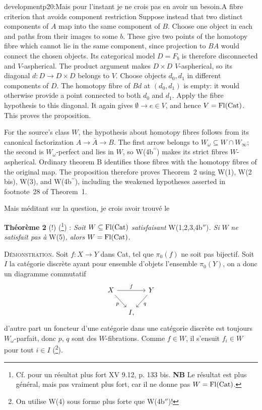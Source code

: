 \begin{dcomment}{development}{p20:Mais pour l'instant je ne crois pas en avoir un besoin.}{A fibre criterion that avoids component restriction}
Suppose instead that two distinct components of \(A\) map into the same component of \(B\). Choose one object in each and paths from their images to some \(b\). These give two points of the homotopy fibre which cannot lie in the same component, since projection to \(BA\) would connect the chosen objects. Its categorical model \(D=F_b\) is therefore disconnected and \(V\)-aspherical. The product argument makes \(D\times D\) \(V\)-aspherical, so its diagonal \(d:D\to D\times D\) belongs to \(V\). Choose objects \(d_0,d_1\) in different components of \(D\). The homotopy fibre of \(Bd\) at \((d_0,d_1)\) is empty: it would otherwise provide a point connected to both \(d_0\) and \(d_1\). Apply the fibre hypothesis to this diagonal. It again gives \(\emptyset\to e\in V\), and hence \(V=\mathrm{Fl}(\mathrm{Cat})\). This proves the proposition.

For the source's class \(W\), the hypothesis about homotopy fibres follows from its canonical factorization \(A\to\bar A\to B\). The first arrow belongs to \(W_\omega\subseteq W\cap W_\infty\); the second is \(W_\omega\)-perfect and lies in \(W\), so W(4b\(^{\prime\prime}\)) makes its strict fibres \(W\)-aspherical. Ordinary theorem B identifies those fibres with the homotopy fibres of the original map. The proposition therefore proves Theorem~2 using W(1), W(2 bis), W(3), and W(4b\(^{\prime\prime}\)), including the weakened hypotheses asserted in footnote~28 of Theorem~1.
\end{dcomment}


Mais méditant sur la question, je crois avoir trouvé le

\textbf{Théorème 2} (!) (\footnote[41]{Cf. pour un résultat plus fort XV 9.12, p. 133 bis. \textbf{NB} Le résultat est plus général, mais pas vraiment plus fort, car il ne donne pas $W = \mathrm{Fl}(\mathrm{Cat})$.}) : \textit{Soit} $W \subseteq \mathrm{Fl}(\mathrm{Cat})$ \textit{satisfaisant} W(1,2,3,4b$''$)\textit{. Si} $W$ \textit{ne satisfait pas à} W(5)\textit{, alors} $W = \mathrm{Fl}(\mathrm{Cat})$.

\textsc{Démonstration}. Soit $f : X \longrightarrow Y$ dans Cat, tel que $\pi_0(f)$ ne soit pas bijectif. Soit $I$ la catégorie discrète ayant pour ensemble d'objets l'ensemble $\pi_0(Y)$, on a donc un diagramme commutatif
\[
\begin{tikzcd}[column sep=small]
X \arrow[rr, "f"] \arrow[dr, "p"'] & & Y \arrow[dl, "q"] \\
& I, &
\end{tikzcd}
\]
d'autre part un foncteur d'une catégorie dans une catégorie discrète est toujours $W_\omega$-parfait, donc $p$, $q$ sont des $W$-fibrations. Comme $f \in W$, il s'ensuit $f_i \in W$ pour tout $i \in I$ (\footnote[42]{On utilise W(4) sous forme plus forte que W(4b$''$)!}).

